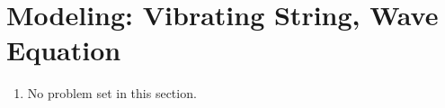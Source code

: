 \section{Modeling: Vibrating String, Wave Equation}

\begin{enumerate}
    \item No problem set in this section.
\end{enumerate}